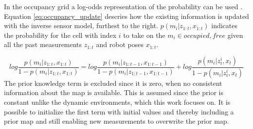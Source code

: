 In the occupancy grid a log-odds representation of the probability can be used \cite{probRob}. 
Equation \ref{eq:occupancy_update} descries how the existing information is updated with the inverse sensor model, furthest to the right. $p(m_i|z_{1:t},x_{1:t})$ indicates the probability for the cell with index $i$ to take on the $m_i \in {occupied,free}$ given all the past measurements $z_{1:t}$ and robot poses $x_{1:t}$. 

\begin{equation}
	log \frac{p(m_i|z_{1:t},x_{1:t})}{1-p(m_i|z_{1:t},x_{1:t})} = log \frac{p(m_i|z_{1:t-1},x_{1:t-1})}{1-p(m_i|z_{1:t-1},x_{1:t-1})} + log \frac{ p(m_i | z_t^i,x_t) }{ 1 - p(m_i | z_t^i,x_t) }
	\label{eq:occupancy_update}
\end{equation}
The prior knowledge term is excluded since it is zero, when no consistent information about the map is available. 
This is assumed since the prior is constant unlike the dynamic environments, which this work focuses on.
It is possible to initialize the first term with initial values and thereby including a prior map and still enabling new measurements to overwrite the prior map. 

